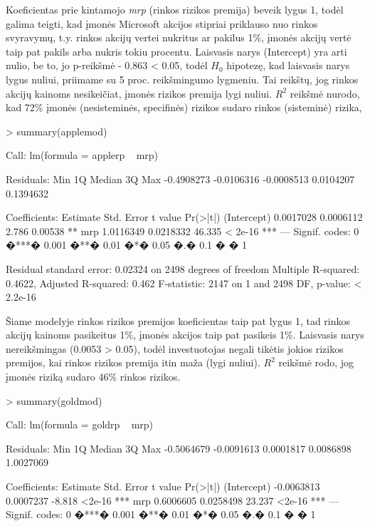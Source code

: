 \documentclass[a4paper]{article}
\begin{document}
\begin{Schunk}
Koeficientas prie kintamojo \textit{mrp} (rinkos rizikos premija) beveik lygus 1, todėl galima teigti, kad įmonės Microsoft 
akcijos stipriai priklauso nuo rinkos svyravymų, t.y. rinkos akcijų vertei nukritus ar pakilus 1\%, įmonės akcijų vertė
taip pat pakils arba nukris tokiu procentu. Laisvasis narys (Intercept) yra arti nulio, be to, jo p-reikšmė - 0.863 < 0.05, todėl 
$H_0$ hipotezę, kad laisvasis narys lygus nuliui, priimame su 5 proc. reikšmingumo lygmeniu. Tai reikštų, jog rinkos akcijų kainoms nesikeičiat, įmonės rizikos premija lygi nuliui. 
$R^2$ reikšmė nurodo, kad 72\% įmonės (nesisteminės, specifinės) rizikos sudaro rinkos (sisteminė) rizika,\\

\begin{Sinput}
> summary(applemod)
\end{Sinput}
\begin{Soutput}
Call:
lm(formula = applerp ~ mrp)

Residuals:
       Min         1Q     Median         3Q        Max 
-0.4908273 -0.0106316 -0.0008513  0.0104207  0.1394632 

Coefficients:
             Estimate Std. Error t value Pr(>|t|)    
(Intercept) 0.0017028  0.0006112   2.786  0.00538 ** 
mrp         1.0116349  0.0218332  46.335  < 2e-16 ***
---
Signif. codes:  0 �***� 0.001 �**� 0.01 �*� 0.05 �.� 0.1 � � 1 

Residual standard error: 0.02324 on 2498 degrees of freedom
Multiple R-squared: 0.4622,	Adjusted R-squared: 0.462 
F-statistic:  2147 on 1 and 2498 DF,  p-value: < 2.2e-16 
\end{Soutput}

Šiame modelyje rinkos rizikos premijos koeficientas taip pat lygus 1, tad rinkos akcijų kainoms pasikeitus 1\%, įmonės akcijos
taip pat pasikeis 1\%.
Laisvasis narys nereikšmingas (0.0053 > 0.05), todėl investuotojas negali tikėtis jokios rizikos premijos, kai rinkos rizikos premija itin maža (lygi nuliui).
$R^2$ reikšmė rodo, jog įmonės riziką sudaro 46\% rinkos rizikos. 

\begin{Sinput}
> summary(goldmod)
\end{Sinput}
\begin{Soutput}
Call:
lm(formula = goldrp ~ mrp)

Residuals:
       Min         1Q     Median         3Q        Max 
-0.5064679 -0.0091613  0.0001817  0.0086898  1.0027069 

Coefficients:
              Estimate Std. Error t value Pr(>|t|)    
(Intercept) -0.0063813  0.0007237  -8.818   <2e-16 ***
mrp          0.6006605  0.0258498  23.237   <2e-16 ***
---
Signif. codes:  0 �***� 0.001 �**� 0.01 �*� 0.05 �.� 0.1 � � 1 


\end{Soutput}
\end{Schunk}
\end{document}
